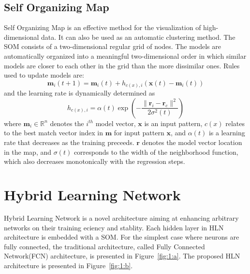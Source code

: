 \documentclass[3p,times,procedia]{elsarticle}
\begin{document}
\subsection{Self Organizing Map}
Self Organizing Map is an effective 
method for the visualization of 
high-dimensional data. 
It can also be used 
as an automatic clustering method. 
The SOM consists of a two-dimensional 
regular grid of nodes. 
The models are automatically 
organized into a meaningful 
two-dimensional order in which 
similar models are closer to
each other in the grid than 
the more dissimilar
ones\cite{kohonen1998self}.
Rules used to update models are:
\begin{equation}
	\mathbf{m}_i(t+1)=\mathbf{m}_i(t)+
	h_{c(x),i}\left(
	\mathbf{x}(t)-\mathbf{m}_i(t)
	\right)
	\label{eq:8}
\end{equation}
and the learning rate is 
dynamically determined as
\begin{equation}
	h_{c(x),i} = \alpha(t)\exp\left(
	-\frac{\|\mathbf{r}_i-\mathbf{r}_c\|^2}
	{2\sigma^2(t)}
	\right)
	\label{eq:9}
\end{equation}
where $\mathbf{m}_i\in\mathbb{R}^n$ 
denotes the $i^{th}$ model vector, 
$\mathbf{x}$ is an input pattern,
$c(x)$ relates to the best match 
vector index
in $\mathbf{m}$ for input 
pattern $\mathbf{x}$,
and $\alpha(t)$ is a learning rate 
that decreases as the
training preceeds.
$\mathbf{r}$ denotes the model vector 
location in 
the map, and $\sigma(t)$ 
corresponds to the 
width of the neighborhood 
function, which 
also decreases monotonically 
with the regression steps.

\section{Hybrid Learning Network}
Hybrid Learning Network is a novel
architecture aiming at 
enhancing arbitrary networks
on their training eciency and
stablity.
Each hidden layer in HLN architecture 
is embedded with a SOM. For the 
simplest case where neurons are fully connected, 
the traditional
architecture, called Fully 
Connected Network(FCN) architecture,
is presented in Figure~\ref{fig:1:a}.
The proposed HLN architecture is
presented in Figure~\ref{fig:1:b}.
\end{document}
